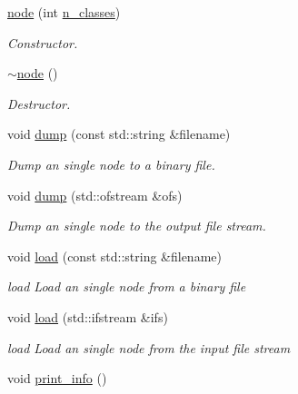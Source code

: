 \begin{DoxyCompactItemize}
\item 
\hyperlink{classnode_a7e5f4a2e917fe20d91d75faf2e9ba5de}{node} (int \hyperlink{classnode_a8c4864582cb3fe15e84e7908d0965150}{n\+\_\+classes})
\begin{DoxyCompactList}\small\item\em Constructor. \end{DoxyCompactList}\item 
\hyperlink{classnode_a482f83436a89f09d289b26144d817adf}{$\sim$node} ()
\begin{DoxyCompactList}\small\item\em Destructor. \end{DoxyCompactList}\item 
void \hyperlink{classnode_a873438b420d0f6d2659a1b25875ed300}{dump} (const std\+::string \&filename)
\begin{DoxyCompactList}\small\item\em Dump an single node to a binary file. \end{DoxyCompactList}\item 
void \hyperlink{classnode_acab00fde3bcc5d44044c39a37313b4eb}{dump} (std\+::ofstream \&ofs)
\begin{DoxyCompactList}\small\item\em Dump an single node to the output file stream. \end{DoxyCompactList}\item 
void \hyperlink{classnode_a6a92c412ae9336cc7ca5f4575a6384c8}{load} (const std\+::string \&filename)
\begin{DoxyCompactList}\small\item\em load Load an single node from a binary file \end{DoxyCompactList}\item 
void \hyperlink{classnode_a6a25c31eb4c3e8c05d5b70b6bd06adff}{load} (std\+::ifstream \&ifs)
\begin{DoxyCompactList}\small\item\em load Load an single node from the input file stream \end{DoxyCompactList}\item 
void \hyperlink{classnode_a95d492b993f2bd1b59c2489e7eb20a13}{print\+\_\+info} ()
\end{DoxyCompactItemize}
